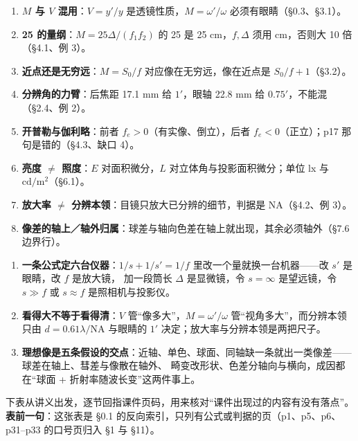 ﻿\documentclass[11pt]{ctexart}
\begin{document}
\begin{enumerate}[label=\textbf{\arabic*.},leftmargin=2.2em]
\item \textbf{$M$ 与 $V$ 混用}：$V=y'/y$ 是透镜性质，$M=\omega'/\omega$ 必须有眼睛（§0.3、§3.1）。
\item \textbf{25 的量纲}：$M=25\Delta/(f_1f_2)$ 的 25 是 25 cm，$f,\Delta$ 须用 cm，否则大 10 倍（§4.1、例 3）。
\item \textbf{近点还是无穷远}：$M=S_0/f$ 对应像在无穷远，像在近点是 $S_0/f+1$（§3.2）。
\item \textbf{分辨角的力臂}：后焦距 17.1 mm 给 $1'$，眼轴 22.8 mm 给 $0.75'$，不能混（§2.4、例 2）。
\item \textbf{开普勒与伽利略}：前者 $f_e>0$（有实像、倒立），后者 $f_e<0$（正立）；p17 那句是错的（§4.3、缺口 4）。
\item \textbf{亮度 $\ne$ 照度}：$E$ 对面积微分，$L$ 对立体角与投影面积微分；单位 lx 与 $\mathrm{cd/m^2}$（§6.1）。
\item \textbf{放大率 $\ne$ 分辨本领}：目镜只放大已分辨的细节，判据是 NA（§4.2、例 3）。
\item \textbf{像差的轴上／轴外归属}：球差与轴向色差在轴上就出现，其余必须轴外（§7.6 边界行）。
\end{enumerate}


\begin{enumerate}[label=\textbf{\arabic*.},leftmargin=2.2em]
\item \textbf{一条公式定六台仪器}：$1/s+1/s'=1/f$ 里改一个量就换一台机器——改 $s'$ 是眼睛，改 $f$ 是放大镜，
加一段筒长 $\Delta$ 是显微镜，令 $s=\infty$ 是望远镜，令 $s\gg f$ 或 $s\approx f$ 是照相机与投影仪。
\item \textbf{看得大不等于看得清}：$V$ 管“像多大”，$M=\omega'/\omega$ 管“视角多大”，而分辨本领只由 $d=0.61\lambda/\mathrm{NA}$
与眼睛的 $1'$ 决定；放大率与分辨本领是两把尺子。
\item \textbf{理想像是五条假设的交点}：近轴、单色、球面、同轴缺一条就出一类像差——球差在轴上、彗差与像散在轴外、
畸变改形状、色差分轴向与横向，成因都在“球面 + 折射率随波长变”这两件事上。
\end{enumerate}


下表从讲义出发，逐节回指课件页码，用来核对“课件出现过的内容有没有落点”。
\textbf{表前一句}：这张表是 §0.1 的反向索引，只列有公式或判据的页（p1、p5、p6、p31--p33 的口号页归入 §1 与 §11）。
\end{document}
